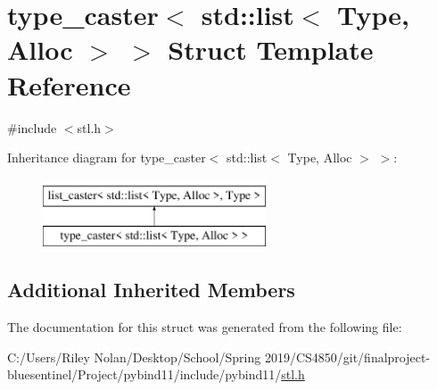 \hypertarget{structtype__caster_3_01std_1_1list_3_01_type_00_01_alloc_01_4_01_4}{}\section{type\+\_\+caster$<$ std\+::list$<$ Type, Alloc $>$ $>$ Struct Template Reference}
\label{structtype__caster_3_01std_1_1list_3_01_type_00_01_alloc_01_4_01_4}


{\ttfamily \#include $<$stl.\+h$>$}

Inheritance diagram for type\+\_\+caster$<$ std\+::list$<$ Type, Alloc $>$ $>$\+:\begin{figure}[H]
\begin{center}
\leavevmode
\includegraphics[height=2.000000cm]{structtype__caster_3_01std_1_1list_3_01_type_00_01_alloc_01_4_01_4}
\end{center}
\end{figure}
\subsection*{Additional Inherited Members}


The documentation for this struct was generated from the following file\+:\begin{DoxyCompactItemize}
\item 
C\+:/\+Users/\+Riley Nolan/\+Desktop/\+School/\+Spring 2019/\+C\+S4850/git/finalproject-\/bluesentinel/\+Project/pybind11/include/pybind11/\mbox{\hyperlink{stl_8h}{stl.\+h}}\end{DoxyCompactItemize}
